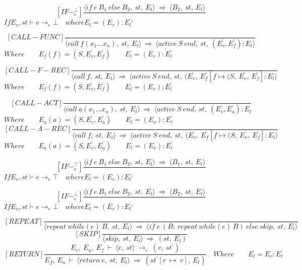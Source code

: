 \[
[IF-^{\bot}_e]
\dfrac{\langle if \ e \ B_1 \ else \ B_2, \ st, \ E_l \rangle \ \Rightarrow \ \langle B_2, \ st, \ E_l \rangle}{}
\]
\begin{math}
If E_v, st \vdash e \rightarrow_e \bot \quad where E_l = (E_v) : E_l{‘}
\end{math}

\[
[CALL-FUNC]
\dfrac{}{ \langle call \ f(x_1 … x_n), \ st, \ E_l \rangle \ \Rightarrow \ \langle active \ S \ end, \ st, \ (E_v^{‘}, E_f^{‘}) : E_l \rangle}
\]
\begin{math}
Where 
\qquad E_f(f) = (S, E_v^{‘}, E_f^{‘})
\qquad E_l = (E_v) : E_l^{‘}
\end{math}

\[
[CALL-F-REC]
\dfrac{}{ \langle call \ f, \ st, \ E_l \rangle \ \Rightarrow \ \langle active \ S \ end, \ st, \ (E_v^{‘}, \ E_f^{‘}[f \mapsto (S, \ E_v^{‘}, \ E_f^{‘}] : E_l \rangle}
\]
\begin{math}
Where
\qquad E_f(f) = (S, E_v^{‘}, E_f^{‘}) 
\qquad E_l = (E_v) : E_l^{‘}
\end{math}

\[
[CALL-ACT]
\dfrac{}{ \langle call \ a(x_1 … x_n), \ st, \ E_l \rangle \ \Rightarrow \ \langle active \ S \ end, \ st, \ (E_v^{‘}, E_a^{‘}) : E_l}
\]
\begin{math}
Where
\qquad E_a(a) = (S, E_v^{‘}, E_a^{‘})
\qquad E_l = (E_v) : E_l^{‘}
\end{math}
\[
[CALL-A-REC]
\dfrac{}{ \langle call \ f, \ st, \ E_l \rangle \ \Rightarrow \ \langle active \ S \ end, \ st, \ (E_v^{‘}, \ E_f^{‘}[f \mapsto (S, \ E_v^{‘}, \ E_f^{‘}] : E_l \rangle}
\]
\begin{math}
Where
\qquad E_a(a) = (S, E_v^{‘}, E_a^{‘})
\qquad E_l = (E_v) : E_l^{‘}		
\end{math}

\[
[IF-^{\top}_e]
\dfrac{\langle if \ e \ B_1 \ else \ B_2, \ st, \ E_l \rangle \ \Rightarrow \ \langle B_1, \ st, \ E_l \rangle}{}
\]
\begin{math}
If E_v, st \vdash e \rightarrow_e \top \quad where E_l = (E_v) : E_l{‘}
\end{math}

\[
[IF-^{\bot}_e]
\dfrac{\langle if \ e \ B_1 \ else \ B_2, \ st, \ E_l \rangle \ \Rightarrow \ \langle B_2, \ st, \ E_l \rangle}{}
\]
\begin{math}
If E_v, st \vdash e \rightarrow_e \bot \quad where E_l = (E_v) : E_l{‘}
\end{math}

\[
[REPEAT]
\dfrac{}{\langle repeat \ while(e) \ B, \ st, \ E_l \rangle \ \Rightarrow \ \langle if \ e \ (B; \ repeat \ while(e) \ B) \ else \ skip, \ st, \ E_l \rangle}
\]\newline
\[
[SKIP]
\dfrac{}{\langle skip, \ st, \ E_l \rangle \ \Rightarrow \ (st, \ E_l)}
\]\newline
\[
[RETURN]	
\dfrac{E_v, \ E_a, \ E_f \ \vdash \ \langle e, \ st \rangle \ \rightarrow_e \ (v, \ st^{'})}{E_f, \ E_a \ \vdash \ \langle return \ e, \ st, \ E_l \rangle \ \Rightarrow \ (st^{'}[r \ \mapsto \ v], \ E_l)}
\quad Where	
\qquad E_l = E_v : E_l^{'}	
\]\newline


